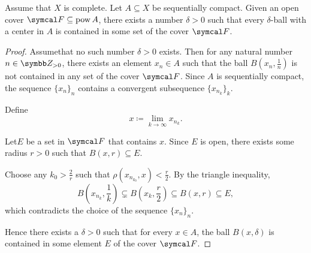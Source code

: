\begin{Lemma}\label{thm:lebesgues_covering_lemma}
  Assume that \( X \) is complete. Let \( A \subseteq X \) be sequentially compact. Given an open cover \( \Cal{F} \subseteq \Pow A \), there exists a number \( \delta > 0 \) such that every \( \delta \)-ball with a center in \( A \) is contained in some set of the cover \( \Cal{F} \).
\end{Lemma}
\begin{proof}
  Assume\LEM that no such number \( \delta > 0 \) exists. Then for any natural number \( n \in \BZ_{>0} \), there exists an element \( x_n \in A \) such that the ball \( B(x_n, \frac 1 n) \) is not contained in any set of the cover \( \Cal{F} \). Since \( A \) is sequentially compact, the sequence \( \{ x_n \}_n \) contains a convergent subsequence \( \{ x_{n_k} \}_k \).

  Define
  \begin{equation*}
    x \coloneqq \lim_{k \to \infty} x_{n_k}.
  \end{equation*}

  Let\AOC \( E \) be a set in \( \Cal{F} \) that contains \( x \). Since \( E \) is open, there exists some radius \( r > 0 \) such that \( B(x, r) \subseteq E \).

  Choose any \( k_0 > \frac 2 r \) such that \( \rho(x_{n_{k_0}}, x) < \frac r 2 \). By the triangle inequality,
  \begin{equation*}
    B \left(x_{n_k}, \frac 1 k \right) \subsetneq B \left(x_k, \frac r 2 \right) \subseteq B(x, r) \subseteq E,
  \end{equation*}
  which contradicts the choice of the sequence \( \{ x_n \}_n \).

  Hence there exists a \( \delta > 0 \) such that for every \( x \in A \), the ball \( B(x, \delta) \) is contained in some element \( E \) of the cover \( \Cal{F} \).
\end{proof}

